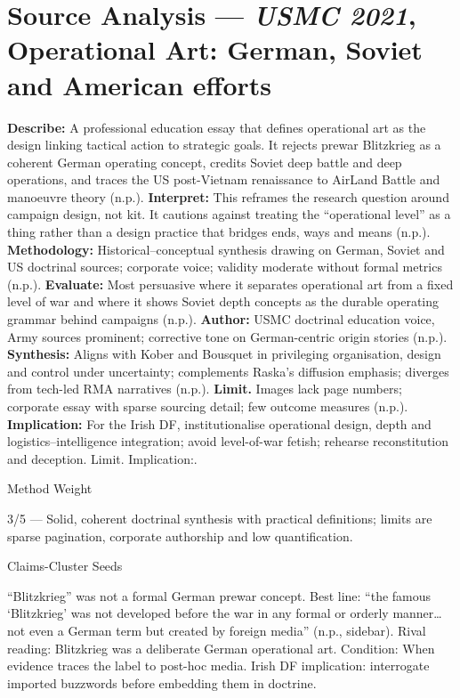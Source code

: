 \section*{Source Analysis — \textit{USMC 2021}, Operational Art: German, Soviet and American efforts}
\textbf{Describe:} A professional education essay that defines operational art as the design linking tactical action to strategic goals. It rejects prewar Blitzkrieg as a coherent German operating concept, credits Soviet deep battle and deep operations, and traces the US post-Vietnam renaissance to AirLand Battle and manoeuvre theory (n.p.).
\textbf{Interpret:} This reframes the research question around campaign design, not kit. It cautions against treating the “operational level” as a thing rather than a design practice that bridges ends, ways and means (n.p.).
\textbf{Methodology:} Historical–conceptual synthesis drawing on German, Soviet and US doctrinal sources; corporate voice; validity moderate without formal metrics (n.p.).
\textbf{Evaluate:} Most persuasive where it separates operational art from a fixed level of war and where it shows Soviet depth concepts as the durable operating grammar behind campaigns (n.p.).
\textbf{Author:} USMC doctrinal education voice, Army sources prominent; corrective tone on German-centric origin stories (n.p.).
\textbf{Synthesis:} Aligns with Kober and Bousquet in privileging organisation, design and control under uncertainty; complements Raska’s diffusion emphasis; diverges from tech-led RMA narratives (n.p.).
\textbf{Limit.} Images lack page numbers; corporate essay with sparse sourcing detail; few outcome measures (n.p.).
\textbf{Implication:} For the Irish DF, institutionalise operational design, depth and logistics–intelligence integration; avoid level-of-war fetish; rehearse reconstitution and deception. Limit. Implication:.

Method Weight

3/5 — Solid, coherent doctrinal synthesis with practical definitions; limits are sparse pagination, corporate authorship and low quantification.

Claims-Cluster Seeds

“Blitzkrieg” was not a formal German prewar concept.
Best line: “the famous ‘Blitzkrieg’ was not developed before the war in any formal or orderly manner… not even a German term but created by foreign media” (n.p., sidebar).
Rival reading: Blitzkrieg was a deliberate German operational art.
Condition: When evidence traces the label to post-hoc media.
Irish DF implication: interrogate imported buzzwords before embedding them in doctrine.

